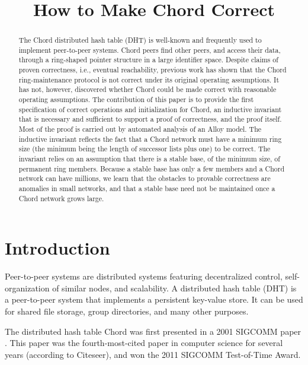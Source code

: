 \documentclass[conference]{IEEEtran}
\begin{document}
\title{How to Make Chord Correct}
\author{
}
\maketitle

\begin{abstract}
The Chord distributed hash table (DHT) is well-known and frequently used to
implement peer-to-peer systems.
Chord peers find other peers, and access their data,
through a ring-shaped pointer
structure in a large identifier space.
Despite claims of proven correctness, i.e., eventual reachability,
previous work
has shown that the Chord ring-maintenance protocol is not correct
under its original operating assumptions.
It has not, however, discovered whether Chord could be made correct
with reasonable operating assumptions.
The contribution of this paper is to provide the first specification
of correct operations and initialization
for Chord, an inductive invariant that is necessary and
sufficient to support a proof of correctness, and the proof itself.
Most of the proof is carried out by automated analysis of an Alloy model.
The inductive invariant reflects the fact that a Chord network must
have a minimum ring size (the minimum being the length of successor lists
plus one) to be correct.
The invariant relies on an assumption
that there is a stable base, of the minimum size,
of permanent ring members.
Because a stable base has only a few members and a Chord network can
have millions, we learn that the obstacles to provable correctness
are anomalies in small networks, and that a stable base need not be
maintained once a Chord network grows large.
\end{abstract}

\section{Introduction}

Peer-to-peer systems are distributed systems featuring decentralized
control, self-organization of similar nodes, 
and scalability.
A distributed hash table (DHT) is a peer-to-peer system that implements
a persistent key-value store.
It can be used for shared file storage, group directories, and many
other purposes.

The distributed hash table Chord 
was first presented in a 2001 
SIGCOMM paper \cite{chord-sigcomm}.
This paper was the fourth-most-cited paper in computer science for
several years (according to Citeseer), and won
the 2011 SIGCOMM Test-of-Time Award.
\end{document}
